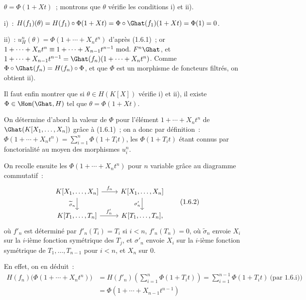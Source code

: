 \(\theta=\Phi(1+Xt)\)~;
montrons que \(\theta\) vérifie les conditions i) et ii).

i)~: \(H(f_1)(\theta)=H(f_1)\circ\Phi(1+Xt)=\Phi\circ\Ghat(f_1)(1+Xt)=\Phi(1)=0\).

ii)~: \(u_H^n(\theta)=\Phi(1+\cdots+X_nt^n)\) d'après (1.6.1)~; or \(1+\cdots+X_nt^n\equiv 1+\cdots+X_{n-1}t^{n-1}\ \mathrm{mod.}\ F^n\Ghat\), et \(1+\cdots+X_{n-1}t^{n-1}=\Ghat(f_n)(1+\cdots+X_nt^n)\). Comme \(\Phi\circ\Ghat(f_n)=H(f_n)\circ\Phi\), et que \(\Phi\) est un morphisme de foncteurs filtrés, on obtient ii).

Il faut enfin montrer que si \(\theta\in H(K[X])\) vérifie i) et ii), il existe \(\Phi\in\Hom(\Ghat,H)\) tel que \(\theta=\Phi(1+Xt)\).

On détermine d'abord la valeur de \(\Phi\) pour l'élément \(1+\cdots+X_nt^n\) de \(\Ghat(K[X_1,\ldots,X_n])\) grâce à (1.6.1)~; on a donc par définition~: \(\Phi(1+\cdots+X_nt^n)=\sum\limits_{i=1}^n \Phi(1+T_it)\), les \(\Phi(1+T_it)\) étant connus par fonctorialité au moyen des morphismes \(u_i^n\).

On recolle ensuite les \(\Phi(1+\cdots+X_nt^n)\) pour \(n\) variable grâce au diagramme commutatif~:
\[
\begin{tikzcd}
K[X_1,\ldots,X_n] \arrow[r,"f_n"] \arrow[d,"\widetilde{\sigma}_n"'] &
K[X_1,\ldots,X_n] \arrow[d,"\sigma'_n"']\\
K[T_1,\ldots,T_n] \arrow[r,"f'_n"] &
K[T_1,\ldots,T_n],
\end{tikzcd}
\tag{1.6.2}
\]
où \(f'_n\) est déterminé par \(f'_n(T_i)=T_i\) si \(i<n\), \(f'_n(T_n)=0\), où \(\widetilde{\sigma}_n\) envoie \(X_i\) sur la \(i\)-ième fonction symétrique des \(T_j\), et \(\sigma'_n\) envoie \(X_i\) sur la \(i\)-ième fonction symétrique de \(T_1,\ldots,T_{n-1}\) pour \(i<n\), et \(X_n\) sur \(0\).

En effet, on en déduit~:
\[
\begin{aligned}
H(f_n)\bigl(\Phi(1+\cdots+X_nt^n)\bigr)
&=H(f'_n)\left(\sum_{i=1}^n \Phi(1+T_it)\right)
=\sum_{i=1}^{n-1}\Phi(1+T_it)\ \text{(par 1.6.i))}\\
&=\Phi(1+\cdots+X_{n-1}t^{n-1})
\end{aligned}
\]
